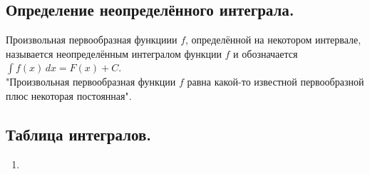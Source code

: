 

\label{sec_Definition21}
\begin{definition}
    \subsection*{Определение неопределённого интеграла.}
    \begin{note}[purple]
        Произвольная первообразная функциии $f$, определённой на некотором интервале, называется 
        неопределённым интегралом функции $f$ и обозначается $\int f(x) \, dx = F(x) + C$. \\
        "Произвольная первообразная функции $f$ равна какой-то известной первообразной плюс 
        некоторая постоянная".
    \end{note}

    \subsection*{Таблица интегралов.}
    \begin{note}[purple]
        \begin{enumerate}
            \item 
        \end{enumerate}
    \end{note}
\end{definition}
